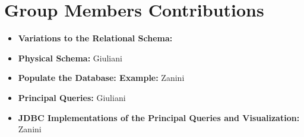 \documentclass{article}
\begin{document}
\maketitle






\section{Group Members Contributions}
\begin{itemize}
	\item \textbf{Variations to the Relational Schema:} 
	\item \textbf{Physical Schema:} Giuliani 
	\item \textbf{Populate the Database: Example:} Zanini
	\item \textbf{Principal Queries:} Giuliani 
	\item \textbf{JDBC Implementations of the Principal Queries and Visualization:} Zanini
\end{itemize}
\end{document}
